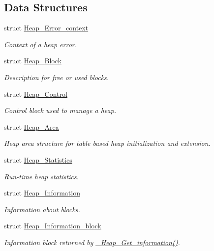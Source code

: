 \subsection*{Data Structures}
\begin{DoxyCompactItemize}
\item 
struct \mbox{\hyperlink{structHeap__Error__context}{Heap\+\_\+\+Error\+\_\+context}}
\begin{DoxyCompactList}\small\item\em Context of a heap error. \end{DoxyCompactList}\item 
struct \mbox{\hyperlink{structHeap__Block}{Heap\+\_\+\+Block}}
\begin{DoxyCompactList}\small\item\em Description for free or used blocks. \end{DoxyCompactList}\item 
struct \mbox{\hyperlink{structHeap__Control}{Heap\+\_\+\+Control}}
\begin{DoxyCompactList}\small\item\em Control block used to manage a heap. \end{DoxyCompactList}\item 
struct \mbox{\hyperlink{structHeap__Area}{Heap\+\_\+\+Area}}
\begin{DoxyCompactList}\small\item\em Heap area structure for table based heap initialization and extension. \end{DoxyCompactList}\item 
struct \mbox{\hyperlink{structHeap__Statistics}{Heap\+\_\+\+Statistics}}
\begin{DoxyCompactList}\small\item\em Run-\/time heap statistics. \end{DoxyCompactList}\item 
struct \mbox{\hyperlink{structHeap__Information}{Heap\+\_\+\+Information}}
\begin{DoxyCompactList}\small\item\em Information about blocks. \end{DoxyCompactList}\item 
struct \mbox{\hyperlink{structHeap__Information__block}{Heap\+\_\+\+Information\+\_\+block}}
\begin{DoxyCompactList}\small\item\em Information block returned by \mbox{\hyperlink{group__RTEMSScoreHeap_ga5ee6c8f0dfa456002f117bb202b5c9a6}{\+\_\+\+Heap\+\_\+\+Get\+\_\+information()}}. \end{DoxyCompactList}\end{DoxyCompactItemize}
